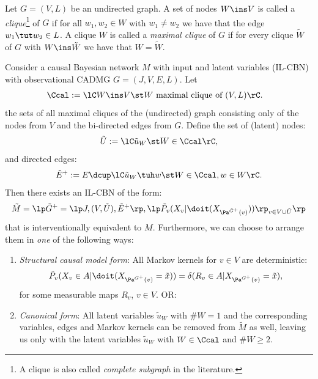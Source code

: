 \begin{Def}
    Let $G=(V,L)$ be an undirected graph.
    A set of nodes $W \ins V$ is called a \emph{clique}\footnote{A clique is also called \emph{complete subgraph} in the literature.} of $G$ if for all $w_1,w_2 \in W$ with $w_1 \neq w_2$ we have that the edge $w_1 \tut w_2 \in L$.
    A clique $W$ is called a \emph{maximal clique} of $G$ if for every clique $\tilde W$ of $G$ with $W \ins \tilde W$ we have that
    $W=\tilde W$.
\end{Def}


\begin{DefThm}
    \label{bcn-scm}
    \label{bcn-standard-form}
Consider a causal Bayesian network $M$ with input and latent variables (IL-CBN) 
with observational CADMG $G=(J,V,E,L)$. Let
\begin{align*}
    \Ccal &:=\lC W \ins V \st W \text{ maximal clique of } (V,L) \rC.
\end{align*}
the sets of all maximal cliques 
of the (undirected) graph consisting only of the nodes from $V$ and the bi-directed edges from $G$.
Define the set of (latent) nodes:
\[ \tilde U := \lC \tilde u_W \st W \in \Ccal \rC,\]
and directed edges:
\[ \tilde E^+ := E \dcup \lC \tilde u_W \tuh w\st W \in \Ccal, w \in W\rC.\]
Then there exists an IL-CBN of the form:
\[\tilde M= \lp \tilde G^+=\lp J,(V,\tilde U),\tilde E^+ \rp, \lp \tilde P_v ( X_v|\doit( X_{\Pa^{\tilde G^+}(v)})) \rp_{v \in V \cup \tilde U} \rp\]
that is interventionally equivalent to $M$.
Furthermore, we can choose to arrange them in \emph{one} of the following ways:
\begin{enumerate}
    \item \emph{Structural causal model form}: All Markov kernels for $v \in V$ are deterministic:
\[ \tilde P_v(X_v \in A|\doit(X_{\Pa^{G^+}(v)}=\tilde x)) =  \delta(R_v \in A|X_{\Pa^{G^+}(v)}=\tilde x), \]
for some measurable maps $R_v$, $v \in V$. OR:
    \item \emph{Canonical form}: All latent variables $\tilde u_W$ with $\#W = 1$ and the corresponding variables, edges and Markov kernels can be removed from $\tilde M$ as well, leaving us only with the latent variables $\tilde u_W$ with $W \in \Ccal$ and $\#W \ge 2$. 
\end{enumerate}
\end{DefThm}

